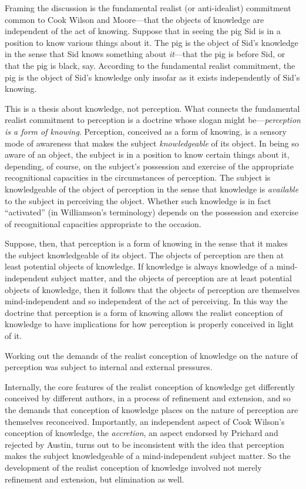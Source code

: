 \documentclass[11pt]{article}
\begin{document}
Framing the discussion is the fundamental realist (or anti-idealist) commitment common to Cook Wilson and Moore---that the objects of knowledge are independent of the act of knowing. Suppose that in seeing the pig Sid is in a position to know various things about it. The pig is the object of Sid's knowledge in the sense that Sid knows something about \emph{it}---that the pig is before Sid, or that the pig is black, say. According to the fundamental realist commitment, the pig is the object of Sid's knowledge only insofar as it exists independently of Sid's knowing. 

This is a thesis about knowledge, not perception. What connects the fundamental realist commitment to perception is a doctrine whose slogan might be---\emph{perception is a form of knowing}. Perception, conceived as a form of knowing, is a sensory mode of awareness that makes the subject \emph{knowledgeable} of its object. In being so aware of an object, the subject is in a position to know certain things about it, depending, of course, on the subject's possession and exercise of the appropriate recognitional capacities in the circumstances of perception. The subject is knowledgeable of the object of perception in the sense that knowledge is \emph{available} to the subject in perceiving the object. Whether such knowledge is in fact ``activated'' (in Williamson's \citeyear{Williamson:1990uq} terminology) depends on the possession and exercise of recognitional capacities appropriate to the occasion.

Suppose, then, that perception is a form of knowing in the sense that it makes the subject knowledgeable of its object. The objects of perception are then at least potential objects of knowledge. If knowledge is always knowledge of a mind-independent subject matter, and the objects of perception are at least potential objects of knowledge, then it follows that the objects of perception are themselves mind-independent and so independent of the act of perceiving. In this way the doctrine that perception is a form of knowing allows the realist conception of knowledge to have implications for how perception is properly conceived in light of it.

Working out the demands of the realist conception of knowledge on the nature of perception was subject to internal and external pressures. 

Internally, the core features of the realist conception of knowledge get differently conceived by different authors, in a process of refinement and extension, and so the demands that conception of knowledge places on the nature of perception are themselves reconceived. Importantly, an independent aspect of Cook Wilson's conception of knowledge, the \emph{accretion}, an aspect endorsed by Prichard and rejected by Austin, turns out to be inconsistent with the idea that perception makes the subject knowledgeable of a mind-independent subject matter. So the development of the realist conception of knowledge involved not merely refinement and extension, but elimination as well.
\end{document}
